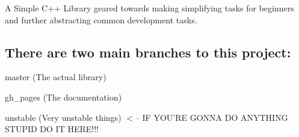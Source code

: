 A Simple C++ Library geared towards making simplifying tasks for beginners and further abstracting common development tasks.

\subsection*{There are two main branches to this project\-:}


\begin{DoxyItemize}
\item master (The actual library)
\item gh\-\_\-pages (The documentation)
\item unstable (Very unstable things) $<$-- I\-F Y\-O\-U'R\-E G\-O\-N\-N\-A D\-O A\-N\-Y\-T\-H\-I\-N\-G S\-T\-U\-P\-I\-D D\-O I\-T H\-E\-R\-E!!! 
\end{DoxyItemize}